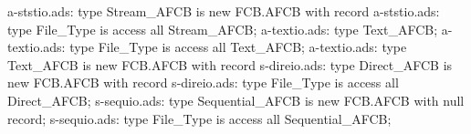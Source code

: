 a-ststio.ads:   type Stream_AFCB is new FCB.AFCB with record
a-ststio.ads:   type File_Type is access all Stream_AFCB;
a-textio.ads:   type Text_AFCB;
a-textio.ads:   type File_Type is access all Text_AFCB;
a-textio.ads:   type Text_AFCB is new FCB.AFCB with record
s-direio.ads:   type Direct_AFCB is new FCB.AFCB with record
s-direio.ads:   type File_Type is access all Direct_AFCB;
s-sequio.ads:   type Sequential_AFCB is new FCB.AFCB with null record;
s-sequio.ads:   type File_Type is access all Sequential_AFCB;
